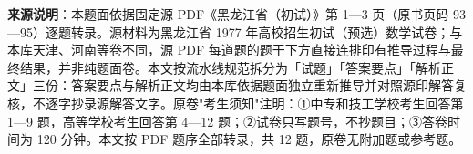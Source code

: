 


\begin{gktip}
\textbf{来源说明}：本题面依据固定源 PDF《黑龙江省（初试）》第 1—3 页（原书页码 93—95）逐题转录。源材料为黑龙江省 1977 年高校招生初试（预选）数学试卷；与本库天津、河南等卷不同，源 PDF 每道题的题干下方直接连排印有推导过程与最终结果，并非纯题面卷。本文按流水线规范拆分为「试题」「答案要点」「解析正文」三份：答案要点与解析正文均由本库依据题面独立重新推导并对照源印解答复核，不逐字抄录源解答文字。原卷"考生须知"注明：①中专和技工学校考生回答第 1—9 题，高等学校考生回答第 4—12 题；②试卷只写题号，不抄题目；③答卷时间为 120 分钟。本文按 PDF 题序全部转录，共 12 题，原卷无附加题或参考题。
\end{gktip}

\par\medskip

